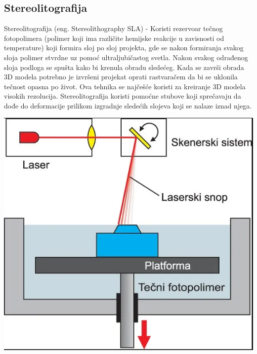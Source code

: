 \documentclass[a4paper]{article}
\begin{document}
{\subsection{Stereolitografija}
\label{subsec:podnaslov3}
Stereolitografija (eng. Stereolithography SLA) - Koristi rezervoar tečnog fotopolimera (polimer koji ima različite hemijske reakcije u zavisnosti od temperature) koji formira sloj po sloj projekta, gde se nakon formiranja svakog sloja polimer stvrdne uz pomoć ultraljubičastog svetla.
\bigbreak Nakon svakog odrađenog sloja podloga se spušta kako bi krenula obradu sledećeg. Kada se završi obrada 3D modela potrebno je izvršeni projekat oprati rastvaračem da bi se uklonila tečnost opasna po život.
\bigbreak Ova tehnika se najčešće koristi za kreiranje 3D modela visokih rezolucija.  Stereolitografija koristi pomoćne stubove koji sprečavaju da dođe do deformacije prilikom izgradnje sledećih slojeva koji se nalaze iznad njega.

\begin{center}
\includegraphics[width=.5\textwidth ]{Tehnikeslike/Stereolitografija.PNG}
\end{center}

\bigbreak
\bigbreak

}
\end{document}
